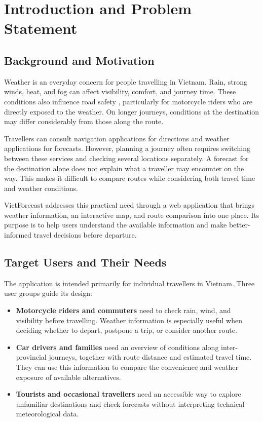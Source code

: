 \chapter{Introduction and Problem Statement}
\label{ch:intro}

\section{Background and Motivation}
Weather is an everyday concern for people travelling in Vietnam. Rain, strong winds, heat, and fog can affect visibility, comfort, and journey time. These conditions also influence road safety \cite{andrey2003weather}, particularly for motorcycle riders who are directly exposed to the weather. On longer journeys, conditions at the destination may differ considerably from those along the route.

Travellers can consult navigation applications for directions and weather applications for forecasts. However, planning a journey often requires switching between these services and checking several locations separately. A forecast for the destination alone does not explain what a traveller may encounter on the way. This makes it difficult to compare routes while considering both travel time and weather conditions.

VietForecast addresses this practical need through a web application that brings weather information, an interactive map, and route comparison into one place. Its purpose is to help users understand the available information and make better-informed travel decisions before departure.

\section{Target Users and Their Needs}
The application is intended primarily for individual travellers in Vietnam. Three user groups guide its design:
\begin{itemize}[itemsep=0.25em]
    \item \textbf{Motorcycle riders and commuters} need to check rain, wind, and visibility before travelling. Weather information is especially useful when deciding whether to depart, postpone a trip, or consider another route.
    \item \textbf{Car drivers and families} need an overview of conditions along inter-provincial journeys, together with route distance and estimated travel time. They can use this information to compare the convenience and weather exposure of available alternatives.
    \item \textbf{Tourists and occasional travellers} need an accessible way to explore unfamiliar destinations and check forecasts without interpreting technical meteorological data.
\end{itemize}

